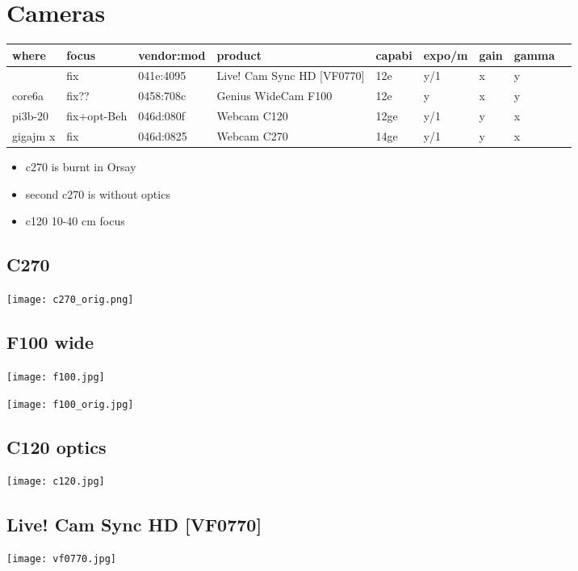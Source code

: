\documentclass[11pt]{article}
\author{ojr}
\date{\today}
\title{}
\begin{document}
\section{Cameras}
\label{sec:orgfd0119f}

\begin{center}
\begin{tabular}{lllllllll}
where & focus & vendor:mod & product & capabi & expo/m & gain & gamma & \\
\hline
 & fix & 041e:4095 & Live! Cam Sync HD [VF0770] & 12e & y/1 & x & y & \\
core6a & fix?? & 0458:708c & Genius WideCam F100 & 12e & y & x & y & \\
pi3b-20 & fix+opt-Beh & 046d:080f & Webcam C120 & 12ge & y/1 & y & x & \\
gigajm x & fix & 046d:0825 & Webcam   C270 & 14ge & y/1 & y & x & \\
\end{tabular}
\end{center}

\begin{itemize}
\item c270 is burnt in Orsay
\item second c270 is without optics
\item c120 10-40 cm focus
\end{itemize}

\subsection{C270}
\label{sec:org5e7c513}
\begin{center}
\texttt{[image: c270\_orig.png]}
\end{center}

\subsection{F100 wide}
\label{sec:org299e466}
\begin{center}
\texttt{[image: f100.jpg]}
\end{center}
\begin{center}
\texttt{[image: f100\_orig.jpg]}
\end{center}

\subsection{C120 optics}
\label{sec:orgd6cc55c}
\begin{center}
\texttt{[image: c120.jpg]}
\end{center}
\subsection{Live! Cam Sync HD [VF0770]}
\label{sec:org9b92b3a}
\begin{center}
\texttt{[image: vf0770.jpg]}
\end{center}
\end{document}
